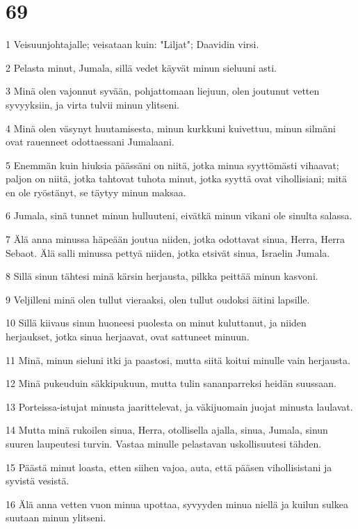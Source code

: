 \chapter{69}

\par 1 Veisuunjohtajalle; veisataan kuin: "Liljat"; Daavidin virsi.
\par 2 Pelasta minut, Jumala, sillä vedet käyvät minun sieluuni asti.
\par 3 Minä olen vajonnut syvään, pohjattomaan liejuun, olen joutunut vetten syvyyksiin, ja virta tulvii minun ylitseni.
\par 4 Minä olen väsynyt huutamisesta, minun kurkkuni kuivettuu, minun silmäni ovat rauenneet odottaessani Jumalaani.
\par 5 Enemmän kuin hiuksia päässäni on niitä, jotka minua syyttömästi vihaavat; paljon on niitä, jotka tahtovat tuhota minut, jotka syyttä ovat vihollisiani; mitä en ole ryöstänyt, se täytyy minun maksaa.
\par 6 Jumala, sinä tunnet minun hulluuteni, eivätkä minun vikani ole sinulta salassa.
\par 7 Älä anna minussa häpeään joutua niiden, jotka odottavat sinua, Herra, Herra Sebaot. Älä salli minussa pettyä niiden, jotka etsivät sinua, Israelin Jumala.
\par 8 Sillä sinun tähtesi minä kärsin herjausta, pilkka peittää minun kasvoni.
\par 9 Veljilleni minä olen tullut vieraaksi, olen tullut oudoksi äitini lapsille.
\par 10 Sillä kiivaus sinun huoneesi puolesta on minut kuluttanut, ja niiden herjaukset, jotka sinua herjaavat, ovat sattuneet minuun.
\par 11 Minä, minun sieluni itki ja paastosi, mutta siitä koitui minulle vain herjausta.
\par 12 Minä pukeuduin säkkipukuun, mutta tulin sananparreksi heidän suussaan.
\par 13 Porteissa-istujat minusta jaarittelevat, ja väkijuomain juojat minusta laulavat.
\par 14 Mutta minä rukoilen sinua, Herra, otollisella ajalla, sinua, Jumala, sinun suuren laupeutesi turvin. Vastaa minulle pelastavan uskollisuutesi tähden.
\par 15 Päästä minut loasta, etten siihen vajoa, auta, että pääsen vihollisistani ja syvistä vesistä.
\par 16 Älä anna vetten vuon minua upottaa, syvyyden minua niellä ja kuilun sulkea suutaan minun ylitseni.
